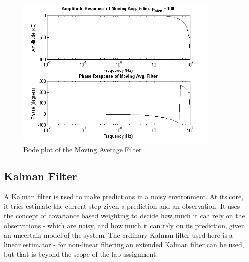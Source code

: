 \documentclass{article}
\theoremstyle{plain}
\theoremstyle{definition}
\theoremstyle{remark}
\begin{document}
\begin{figure}[hbt]
\begin{center}
\includegraphics[width = 10cm]{bode_MAvgF}
\caption{Bode plot of the Moving Average Filter}
\label{bode_MAvgF}
\end{center}
\end{figure}
 
\clearpage

\subsection{Kalman Filter}
A Kalman filter is used to make predictions in a noisy environment. At its core, it tries estimate the current step given a prediction and an observation. It uses the concept of covariance based weighting to decide how much it can rely on the observations - which are noisy, and how much it can rely on its prediction, given an uncertain model of the system. The ordinary Kalman filter used here is a linear estimator - for non-linear filtering an extended Kalman filter can be used, but that is beyond the scope of the lab assignment.\\
\end{document}

